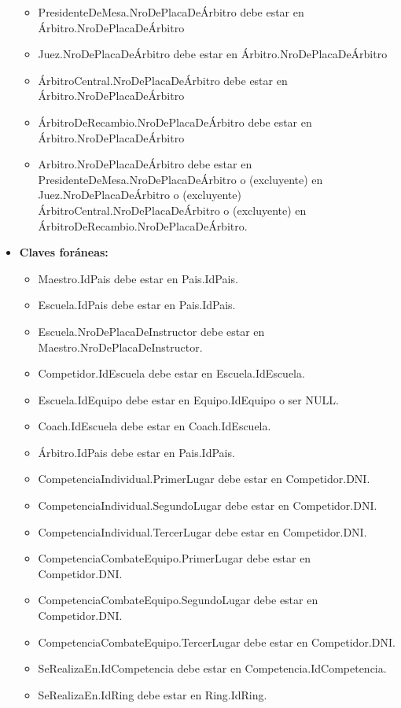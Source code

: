\begin{itemize}
\begin{itemize}
        \item PresidenteDeMesa.NroDePlacaDeÁrbitro debe estar en Árbitro.NroDePlacaDeÁrbitro
        \item Juez.NroDePlacaDeÁrbitro debe estar en Árbitro.NroDePlacaDeÁrbitro
        \item ÁrbitroCentral.NroDePlacaDeÁrbitro debe estar en Árbitro.NroDePlacaDeÁrbitro
        \item ÁrbitroDeRecambio.NroDePlacaDeÁrbitro debe estar en Árbitro.NroDePlacaDeÁrbitro
        \item Arbitro.NroDePlacaDeÁrbitro debe estar en PresidenteDeMesa.NroDePlacaDeÁrbitro o (excluyente) en Juez.NroDePlacaDeÁrbitro o (excluyente) ÁrbitroCentral.NroDePlacaDeÁrbitro o (excluyente) en ÁrbitroDeRecambio.NroDePlacaDeÁrbitro.
    \end{itemize}
    \item \textbf{Claves foráneas:}
    \begin{itemize}
        \item Maestro.IdPais debe estar en Pais.IdPais.
        \item Escuela.IdPais debe estar en Pais.IdPais.
        \item Escuela.NroDePlacaDeInstructor debe estar en Maestro.NroDePlacaDeInstructor.
        \item Competidor.IdEscuela debe estar en Escuela.IdEscuela.
        \item Escuela.IdEquipo debe estar en Equipo.IdEquipo o ser NULL.
        \item Coach.IdEscuela debe estar en Coach.IdEscuela.
        \item Árbitro.IdPais debe estar en Pais.IdPais.
        \item CompetenciaIndividual.PrimerLugar debe estar en Competidor.DNI.
        \item CompetenciaIndividual.SegundoLugar debe estar en Competidor.DNI.
        \item CompetenciaIndividual.TercerLugar debe estar en Competidor.DNI.
        \item CompetenciaCombateEquipo.PrimerLugar debe estar en Competidor.DNI.
        \item CompetenciaCombateEquipo.SegundoLugar debe estar en Competidor.DNI.
        \item CompetenciaCombateEquipo.TercerLugar debe estar en Competidor.DNI.
        \item SeRealizaEn.IdCompetencia debe estar en Competencia.IdCompetencia.
        \item SeRealizaEn.IdRing debe estar en Ring.IdRing.

\end{itemize}
\end{itemize}
